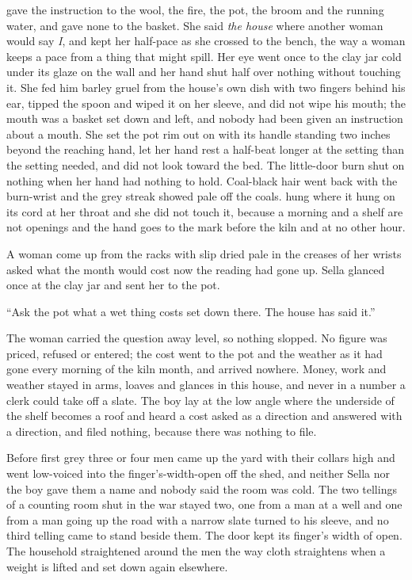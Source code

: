  gave the instruction to the wool, the fire, the pot, the broom and the running water, and gave none to the basket. She said \emph{the house} where another woman would say \emph{I}, and kept her half-pace as she crossed to the bench, the way a woman keeps a pace from a thing that might spill. Her eye went once to the clay jar cold under its glaze on the wall and her hand shut half over nothing without touching it. She fed him barley gruel from the house's own dish with two fingers behind his ear, tipped the spoon and wiped it on her sleeve, and did not wipe his mouth; the mouth was a basket set down and left, and nobody had been given an instruction about a mouth. She set the pot rim out on  with its handle standing two inches beyond the reaching hand, let her hand rest a half-beat longer at the setting than the setting needed, and did not look toward the bed. The little-door burn shut on nothing when her hand had nothing to hold. Coal-black hair went back with the burn-wrist and the grey streak showed pale off the coals.  hung where it hung on its cord at her throat and she did not touch it, because a morning and a shelf are not openings and the hand goes to the mark before the kiln and at no other hour.

A woman come up from the racks with slip dried pale in the creases of her wrists asked what the month would cost now the reading had gone up. Sella glanced once at the clay jar and sent her to the pot.

“Ask the pot what a wet thing costs set down there. The house has said it.”

The woman carried the question away level, so nothing slopped. No figure was priced, refused or entered; the cost went to the pot and the weather as it had gone every morning of the kiln month, and arrived nowhere. Money, work and weather stayed in arms, loaves and glances in this house, and never in a number a clerk could take off a slate. The boy lay at the low angle where the underside of the shelf becomes a roof and heard a cost asked as a direction and answered with a direction, and filed nothing, because there was nothing to file.

Before first grey three or four men came up the yard with their collars high and went low-voiced into the finger's-width-open  off the shed, and neither Sella nor the boy gave them a name and nobody said the room was cold. The two tellings of a counting room shut in the war stayed two, one from a man at a well and one from a man going up the road with a narrow slate turned to his sleeve, and no third telling came to stand beside them. The door kept its finger's width of open. The household straightened around the men the way cloth straightens when a weight is lifted and set down again elsewhere.

